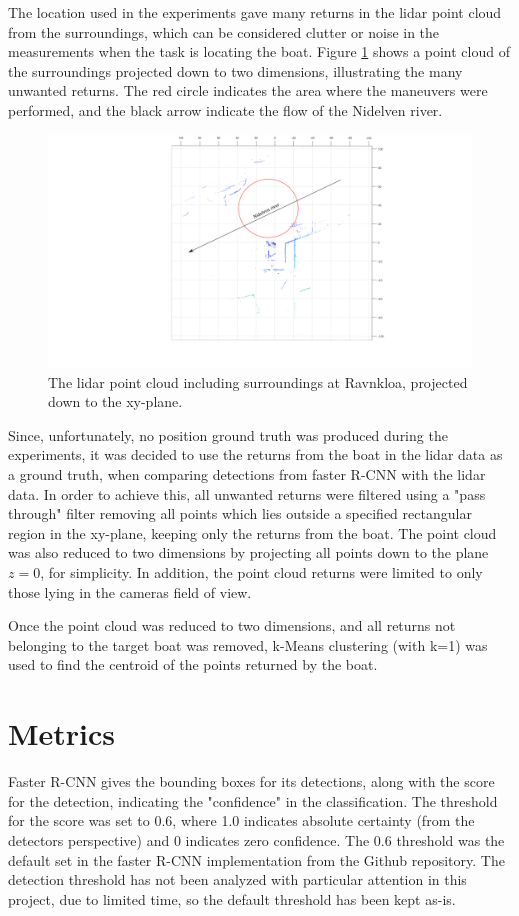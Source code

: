 The location used in the experiments gave many returns in the lidar point cloud from the surroundings, which can be considered clutter or noise in the measurements when the task is locating the boat. Figure \ref{fig:ravnkloa_pointcloud} shows a point cloud of the surroundings projected down to two dimensions, illustrating the many unwanted returns. The red circle indicates the area where the maneuvers were performed, and the black arrow indicate the flow of the Nidelven river. 
\begin{figure}[H]
	\centering
	\includegraphics[width=\linewidth]{fig/ravnkloa_surroundings.png}
	\caption{The lidar point cloud including surroundings at Ravnkloa, projected down to the xy-plane.}
	\label{fig:ravnkloa_pointcloud}
\end{figure}
Since, unfortunately, no position ground truth was produced during the experiments, it was decided to use the returns from the boat in the lidar data as a ground truth, when comparing detections from faster R-CNN with the lidar data. In order to achieve this, all unwanted returns were filtered using a "pass through" filter removing all points which lies outside a specified rectangular region in the xy-plane, keeping only the returns from the boat. The point cloud was also reduced to two dimensions by projecting all points down to the plane $z=0$, for simplicity. In addition, the point cloud returns were limited to only those lying in the cameras field of view.

Once the point cloud was reduced to two dimensions, and all returns not belonging to the target boat was removed, k-Means clustering (with k=1) was used to find the centroid of the points returned by the boat.
\section{Metrics}
Faster R-CNN gives the bounding boxes for its detections, along with the score for the detection, indicating the "confidence" in the classification. The threshold for the score was set to 0.6, where 1.0 indicates absolute certainty (from the detectors perspective) and 0 indicates zero confidence. The 0.6 threshold was the default set in the faster R-CNN implementation from the Github repository. The detection threshold has not been analyzed with particular attention in this project, due to limited time, so the default threshold has been kept as-is.

